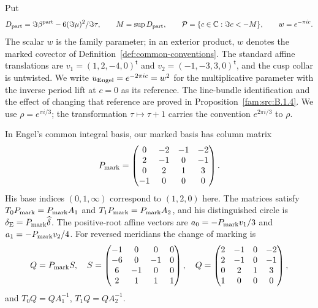 \begin{definition}
\hypertarget{tag-PI01}{}\label{I:def:family-parameter}
Put
\begin{equation}
 D_{\rm part}=\Im\beta^{\rm part}
                  -6(\Im\mu)^2/\Im\tau,\qquad
 M=\sup D_{\rm part},\qquad
 \mathcal P=\{c\in\mathbb C:\Im c<-M\},\qquad w=e^{-\pi ic}.
\label{pub:I:eq:PD1}
\end{equation}
The scalar $w$ is the family parameter; in an exterior product,
$w$ denotes the marked covector of Definition~\ref{def:common-conventions}.
The standard affine translations are
$v_1=(1,2,-4,0)^{\mathsf t}$ and
$v_2=(-1,-3,3,0)^{\mathsf t}$, and the cusp collar is untwisted.
We write $u_{\rm Engel}=e^{-2\pi ic}=w^2$ for the multiplicative
parameter with the inverse period lift at $c=0$ as its reference.
The line-bundle identification and the effect of changing that reference
are proved in Proposition~\ref{fam:src:B.1.4}.
We use $\rho=e^{\pi i/3}$; the transformation $\tau\mapsto\tau+1$
carries the convention $e^{2\pi i/3}$ to $\rho$.
\end{definition}

\begin{proposition}
\hypertarget{tag-01S2}{}\label{inv:B1.0}
In Engel's common integral basis, our marked basis has column matrix
\[
 P_{\rm mark}=\begin{pmatrix}
 0&-2&-1&-2\\2&-1&0&-1\\0&2&1&3\\-1&0&0&0
 \end{pmatrix}.
\]
His base indices $(0,1,\infty)$ correspond to $(1,2,0)$ here.
The matrices satisfy $T_0P_{\rm mark}=P_{\rm mark}A_1$ and
$T_1P_{\rm mark}=P_{\rm mark}A_2$, and his distinguished circle is
$\delta_{\rm E}=P_{\rm mark}\widehat\delta$.
The positive-root affine vectors are
$a_0=-P_{\rm mark}v_1/3$ and $a_1=-P_{\rm mark}v_2/4$.
For reversed meridians the change of marking is
\[
 Q=P_{\rm mark}S,
 \quad S=\begin{pmatrix}-1&0&0&0\\-6&0&-1&0\\6&-1&0&0\\2&1&1&1\end{pmatrix},
 \quad Q=\begin{pmatrix}2&-1&0&-2\\2&-1&0&-1\\0&2&1&3\\1&0&0&0\end{pmatrix},
\]
and $T_0Q=QA_1^{-1}$, $T_1Q=QA_2^{-1}$.
\end{proposition}

